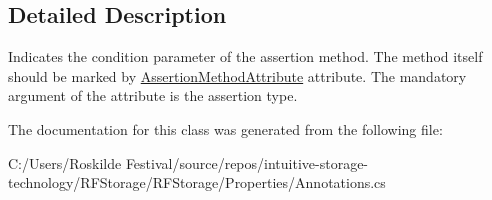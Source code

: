 \subsection{Detailed Description}
Indicates the condition parameter of the assertion method. The method itself should be marked by \mbox{\hyperlink{class_r_f_storage_1_1_assertion_method_attribute}{Assertion\+Method\+Attribute}} attribute. The mandatory argument of the attribute is the assertion type. 



The documentation for this class was generated from the following file\+:\begin{DoxyCompactItemize}
\item 
C\+:/\+Users/\+Roskilde Festival/source/repos/intuitive-\/storage-\/technology/\+R\+F\+Storage/\+R\+F\+Storage/\+Properties/Annotations.\+cs\end{DoxyCompactItemize}
